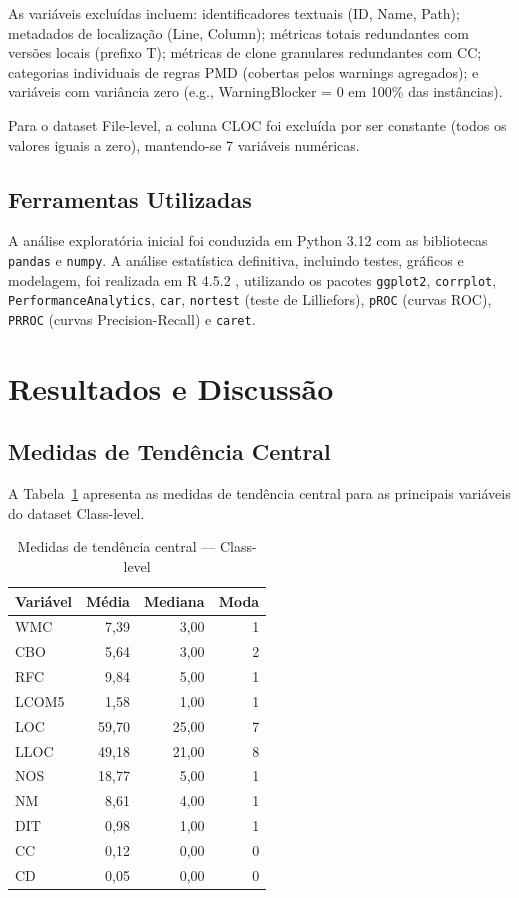\documentclass[12pt]{article}
\begin{document}
As variáveis excluídas incluem: identificadores textuais (ID, Name, Path); metadados de localização (Line, Column); métricas totais redundantes com versões locais (prefixo T); métricas de clone granulares redundantes com CC; categorias individuais de regras PMD (cobertas pelos warnings agregados); e variáveis com variância zero (e.g., WarningBlocker = 0 em 100\% das instâncias).

Para o dataset File-level, a coluna CLOC foi excluída por ser constante (todos os valores iguais a zero), mantendo-se 7 variáveis numéricas.

\subsection{Ferramentas Utilizadas}

A análise exploratória inicial foi conduzida em Python 3.12 com as bibliotecas \texttt{pandas} e \texttt{numpy}. A análise estatística definitiva, incluindo testes, gráficos e modelagem, foi realizada em R 4.5.2 \cite{rcoreteam2024}, utilizando os pacotes \texttt{ggplot2}, \texttt{corrplot}, \texttt{PerformanceAnalytics}, \texttt{car}, \texttt{nortest} (teste de Lilliefors), \texttt{pROC} (curvas ROC), \texttt{PRROC} (curvas Precision-Recall) e \texttt{caret}.

\section{Resultados e Discussão} \label{sec:resultados}

\subsection{Medidas de Tendência Central}

A Tabela~\ref{tab:tendencia_class} apresenta as medidas de tendência central para as principais variáveis do dataset Class-level.

\begin{table}[H]
\centering
\caption{Medidas de tendência central --- Class-level}
\label{tab:tendencia_class}
\small
\begin{tabular}{lrrr}
\toprule
\textbf{Variável} & \textbf{Média} & \textbf{Mediana} & \textbf{Moda} \\
\midrule
WMC   & 7,39   & 3,00   & 1 \\
CBO   & 5,64   & 3,00   & 2 \\
RFC   & 9,84   & 5,00   & 1 \\
LCOM5 & 1,58   & 1,00   & 1 \\
LOC   & 59,70  & 25,00  & 7 \\
LLOC  & 49,18  & 21,00  & 8 \\
NOS   & 18,77  & 5,00   & 1 \\
NM    & 8,61   & 4,00   & 1 \\
DIT   & 0,98   & 1,00   & 1 \\
CC    & 0,12   & 0,00   & 0 \\
CD    & 0,05   & 0,00   & 0 \\
\bottomrule
\end{tabular}
\end{table}
\end{document}
